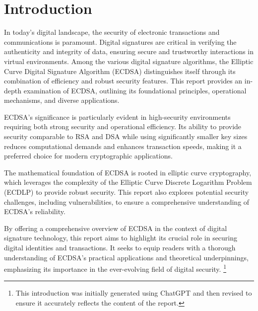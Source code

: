 \section{Introduction}

In today's digital landscape, the security of electronic transactions and communications is paramount. Digital signatures are critical in verifying the authenticity and integrity of data, ensuring secure and trustworthy interactions in virtual environments. Among the various digital signature algorithms, the Elliptic Curve Digital Signature Algorithm (ECDSA) distinguishes itself through its combination of efficiency and robust security features. This report provides an in-depth examination of ECDSA, outlining its foundational principles, operational mechanisms, and diverse applications.

ECDSA's significance is particularly evident in high-security environments requiring both strong security and operational efficiency. Its ability to provide security comparable to RSA and DSA while using significantly smaller key sizes reduces computational demands and enhances transaction speeds, making it a preferred choice for modern cryptographic applications.

The mathematical foundation of ECDSA is rooted in elliptic curve cryptography, which leverages the complexity of the Elliptic Curve Discrete Logarithm Problem (ECDLP) to provide robust security. This report also explores potential security challenges, including vulnerabilities, to ensure a comprehensive understanding of ECDSA's reliability.

By offering a comprehensive overview of ECDSA in the context of digital signature technology, this report aims to highlight its crucial role in securing digital identities and transactions. It seeks to equip readers with a thorough understanding of ECDSA's practical applications and theoretical underpinnings, emphasizing its importance in the ever-evolving field of digital security. \footnote{This introduction was initially generated using ChatGPT and then revised to ensure it accurately reflects the content of the report.}